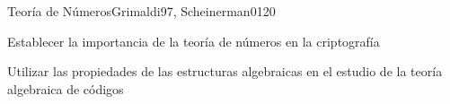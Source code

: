 \begin{syllabus}
\begin{unit}{Teoría de Números}{Grimaldi97, Scheinerman01}{20}
   \begin{unitgoals}
      \item Establecer la importancia de la teoría de números en la criptografía
      \item Utilizar las propiedades de las estructuras algebraicas en el estudio de la teoría algebraica de códigos
   \end{unitgoals}
\end{unit}

\begin{coursebibliography}
\end{coursebibliography}

\end{syllabus}

%
